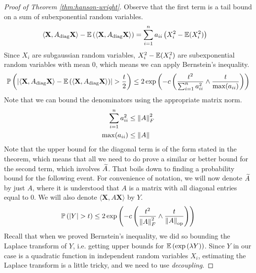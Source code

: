 \documentclass[11pt]{article}
\begin{document}
\begin{proof}[Proof of Theorem \ref{thm:hanson-wright}]
  Observe that the first term is a tail bound on a sum of subexponential random variables.
  \begin{align*}
    \langle \mathbf{X}, A_{\mathrm{diag}} \mathbf{X} \rangle - \mathbb{E}\left( \langle \mathbf{X}, A_{\mathrm{diag}} \mathbf{X} \rangle \right)
    &= \sum_{i=1}^{n} a_{ii}\left( X_i^2 - \mathbb{E}(X_i^2) \right)
  \end{align*}
  Since $X_i$ are subgaussian random variables, $X_i^2 - \mathbb{E}(X_i^2)$ are subexponential random variables with mean $0$, which means we can apply Bernstein's inequality.
  \begin{align*}
    \mathbb{P}\left( \left| \langle \mathbf{X}, A_{\mathrm{diag}} \mathbf{X} \rangle - \mathbb{E}\left( \langle \mathbf{X}, A_{\mathrm{diag}} \mathbf{X} \rangle \right) \right| > \frac{t}{2} \right)
    \leq 2 \exp\left( -c \left( \frac{t^2}{\sum_{i=1}^n a_{ii}^2} \wedge \frac{t}{\max(a_{ii})} \right) \right)
  \end{align*}
  Note that we can bound the denominators using the appropriate matrix norm.
  \begin{align*}
    \sum_{i=1}^{n} a_{ii}^2 &\leq \left\lVert A\right\rVert_F^2 \\
    \max(a_{ii}) &\leq \left\lVert A\right\rVert
  \end{align*}
  Note that the upper bound for the diagonal term is of the form stated in the theorem, which means that all we need to do prove a similar or better bound for the second term, which involves $\widetilde{A}$.
  That boils down to finding a probability bound for the following event.
  For convenience of notation, we will now denote $\widetilde{A}$ by just $A$, where it is understood that $A$ is a matrix with all diagonal entries equal to $0$.
  We will also denote $\langle \mathbf{X}, A \mathbf{X} \rangle$ by $Y$.
  \begin{align*}
    \mathbb{P}\left( \left| Y \right| > t \right)
    \leq 2 \exp\left( -c \left( \frac{t^2}{\left\lVert A\right\rVert_F^2} \wedge \frac{t}{\left\lVert A\right\rVert_{\mathrm{op}}} \right) \right)
  \end{align*}
  Recall that when we proved Bernstein's inequality, we did so bounding the Laplace transform of $Y$, i.e. getting upper bounds for $\mathbb{E}\left( \exp\left( \lambda Y \right) \right)$.
  Since $Y$ in our case is a quadratic function in independent random variables $X_i$, estimating the Laplace transform is a little tricky, and we need to use \emph{decoupling}.


\end{proof}
\end{document}
